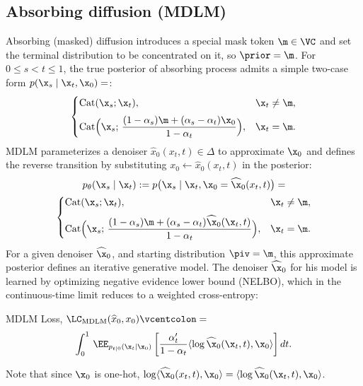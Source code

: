   \subsection{Absorbing diffusion (MDLM)}
\label{sec:mdlm}
Absorbing (masked) diffusion introduces a special mask token $\m \in \VC$ and set the terminal distribution to be concentrated on it, so $\prior = \m$. For $0 \le s < t \le 1$, the true posterior of absorbing process admits a simple two-case form $p(\x_s \mid \x_t, \x_0)=$:
\begin{equation}
\begin{cases}
\text{Cat}(\x_s; \x_t), & \x_t \neq \m,\\[2mm]
\text{Cat}\Big(\x_s;\, \dfrac{(1-\alpha_s)\m + (\alpha_s-\alpha_t)\x_0}{1-\alpha_t}\Big), & \x_t = \m.
\end{cases}
\end{equation}
MDLM parameterizes a denoiser $\widehat{x}_0(x_t,t) \in \Delta$ to approximate $\x_0$ and defines the reverse transition by substituting
$x_0 \leftarrow \widehat{x}_0(x_t,t)$ in the posterior:
\begin{gather}
  p_\theta(\x_s \mid \x_t)
  :=
  p\big(\x_s \mid \x_t, \x_0=\widehat{\x}_0(x_t,t)\big)
  =
  \\
  \begin{cases}
    \text{Cat}(\x_s; \x_t), & \x_t \neq \m,\\[2mm]
    \text{Cat}\Big(\x_s;\, \dfrac{(1-\alpha_s)\m + (\alpha_s-\alpha_t)\widehat{\x}_0(\x_t,t)}{1-\alpha_t}\Big), & \x_t = \m.
  \end{cases}
  \nonumber
\end{gather}
%
For a given denoiser $\widehat{\x}_0$, and starting distribution $\piv = \m$, this approximate posterior defines an iterative generative model. The denoiser $\widehat{\x}_0$ for his model is learned by optimizing negative evidence lower bound (NELBO), which in the continuous-time limit reduces to a weighted cross-entropy:
  \begin{Box1}{MDLM Loss, $\LC_{\text{MDLM}}(\widehat{x}_0, x_0) \vcentcolon=$}
    \vspace{-8pt}
    \begin{gather}
      \int_0^1 \, \EE_{p_{t|0}(\x_t \mid \x_0)} \left[
          \frac{\alpha_t'}{1-\alpha_t} \langle \log\widehat{\x}_0(\x_t, t), \x_0 \rangle
      \right] dt.
    \label{eq:mdlm loss}
    \end{gather}
  \end{Box1}
Note that since $\x_0$ is one-hot, $\log\langle \widehat{\x}_0(x_t,t), \x_0\rangle = \langle \log \widehat{\x}_0(\x_t,t), \x_0\rangle$.
  
